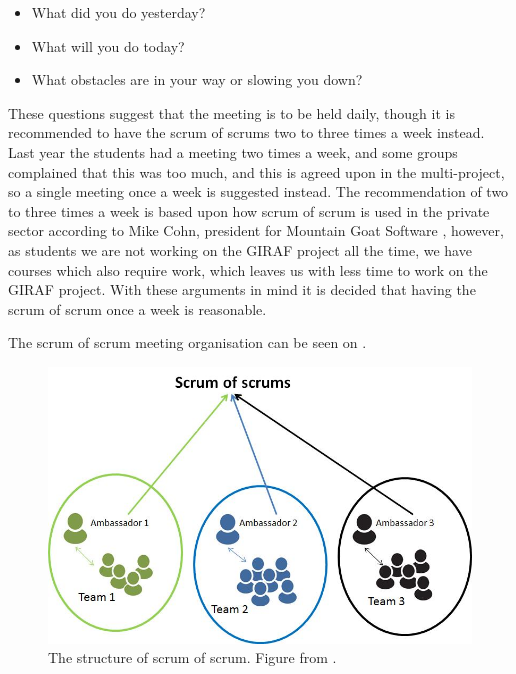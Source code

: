 \begin{itemize}
    \item What did you do yesterday? 
    \item What will you do today?
    \item What obstacles are in your way or slowing you down?
\end{itemize}

These questions suggest that the meeting is to be held daily, though it is recommended to have the scrum of scrums two to three times a week instead. 
Last year the students had a meeting two times a week, and some groups complained that this was too much, and this is agreed upon in the multi-project, so a single meeting once a week is suggested instead.
The recommendation of two to three times a week is based upon how scrum of scrum is used in the private sector according to Mike Cohn, president for Mountain Goat Software \citep{SCRUMoSCRUM}, however, as students we are not working on the GIRAF project all the time, we have courses which also require work, which leaves us with less time to work on the GIRAF project. 
With these arguments in mind it is decided that having the scrum of scrum once a week is reasonable.

The scrum of scrum meeting organisation can be seen on .

\begin{figure}
\centering
\includegraphics[scale=0.4]{figures/scrumofscrum.png}
\caption{The structure of scrum of scrum. Figure from \cite{scrumofscrumfigure}.}
\label{fig:scrumofscrum}
\end{figure}

